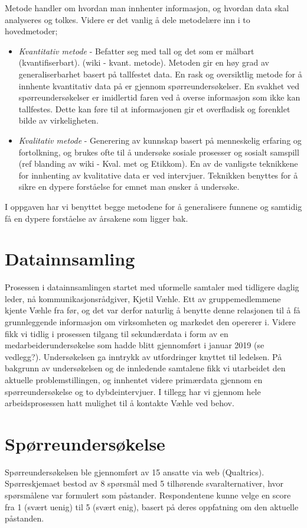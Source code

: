 Metode handler om hvordan man innhenter informasjon, og hvordan data skal analyseres og tolkes. Videre er det vanlig å dele metodelære inn i to hovedmetoder;
\begin{itemize}
\item\textit{Kvantitativ metode} - Befatter seg med tall og det som er målbart (kvantifiserbart). (wiki - kvant. metode). Metoden gir en høy grad av generaliserbarhet basert på tallfestet data. En rask og oversiktlig metode for å innhente kvantitativ data på er gjennom spørreundersøkelser. En svakhet ved spørreundersøkelser er imidlertid faren ved å overse informasjon som ikke kan tallfestes. Dette kan føre til at informasjonen gir et overfladisk og forenklet bilde av virkeligheten.
\item\textit{Kvalitativ metode} - Generering av kunnskap basert på menneskelig erfaring og fortolkning, og brukes ofte til å undersøke sosiale prosesser og sosialt samspill (ref blanding av wiki - Kval. met og Etikkom). En av de vanligste teknikkene for innhenting av kvalitative data er ved intervjuer. Teknikken benyttes for å sikre en dypere forståelse for emnet man ønsker å undersøke.
\end{itemize}

I oppgaven har vi benyttet begge metodene for å generalisere funnene og samtidig få en dypere forståelse av årsakene som ligger bak. 

\section{Datainnsamling}
Prosessen i datainnsamlingen startet med uformelle samtaler med tidligere daglig leder, nå kommunikasjonsrådgiver, Kjetil Væhle. Ett av gruppemedlemmene kjente Væhle fra før, og det var derfor naturlig å benytte denne relasjonen til å få grunnleggende informasjon om virksomheten og markedet den opererer i. Videre fikk vi tidlig i prosessen tilgang til sekundærdata i form av en medarbeiderundersøkelse som hadde blitt gjennomført i januar 2019 (se vedlegg?). Undersøkelsen ga inntrykk av utfordringer knyttet til ledelsen. På bakgrunn av undersøkelsen og de innledende samtalene fikk vi utarbeidet den aktuelle problemstillingen, og innhentet videre primærdata gjennom en spørreundersøkelse og to dybdeintervjuer. I tillegg har vi gjennom hele arbeidsprosessen hatt mulighet til å kontakte Væhle ved behov.

\section{Spørreundersøkelse}
Spørreundersøkelsen ble gjennomført av 15 ansatte via web (Qualtrics). Spørreskjemaet bestod av 8 spørsmål med 5 tilhørende svaralternativer, hvor spørsmålene var formulert som påstander. Respondentene kunne velge en score fra 1 (svært uenig) til 5 (svært enig), basert på deres oppfatning om den aktuelle påstanden. 

